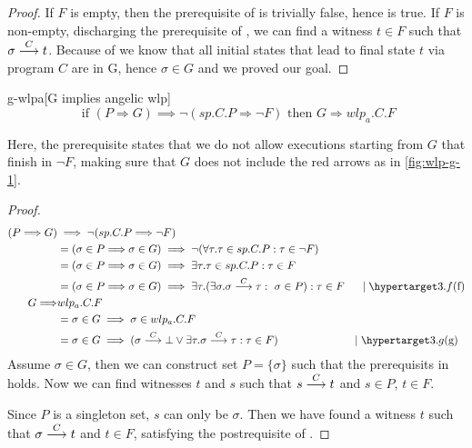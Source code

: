 \begin{proof}
If $F$ is empty, then the prerequisite of  is trivially false, hence  is true. 
If $F$ is non-empty, discharging the prerequisite of , we can find a witness $t\in F$ such that $\sigma\stackrel{C}{\longrightarrow}t$. 
Because of  we know that all initial states that lead to final state $t$ via program $C$ are in G, hence $\sigma\in G$ and we proved our goal. 
\end{proof}


\begin{lemma}{g-wlpa}[G implies angelic wlp]
\ \\ \vspace{-3mm}
	\[%
	\text{ if \ \ \ \ } 
	(P\Longrightarrow G) \implies \neg(sp.C.P \Longrightarrow \neg F)
	\text{\ \ \ \  then\ \ \ \  } 
	G \Longrightarrow wlp_a.C.F
	\] 
\end{lemma}
Here, the prerequisite states that we do not allow executions starting from $G$ that  finish in $\neg F$, making sure that $G$ does not include the red arrows as in \autoref{fig:wlp-g-1}.  

\begin{proof}
\begin{align*} 
	(P\Longrightarrow G) & \implies \neg(sp.C.P \Longrightarrow \neg F) \\ 
	&= (\sigma\in P \Longrightarrow \sigma\in G) \implies \neg(\forall\tau.\tau\in sp.C.P:\tau\in\neg F) \\ 
	&= (\sigma\in P \Longrightarrow \sigma\in G) \implies \exists\tau.\tau\in sp.C.P:\tau\in F \\ 
	&= (\sigma\in P \Longrightarrow \sigma\in G) \implies \exists\tau.(\exists \sigma. \sigma\goto{C}\tau: \  \sigma\in P):\tau\in F 
		\hspace{0.04\textwidth}\mid\lblth{f}\\ 
	G\Longrightarrow & wlp_a.C.F \\ 
	&= \sigma\in G\implies\sigma\in wlp_a.C.F\\
	&=\sigma\in G\implies (\sigma\goto{C}\bot\vee \exists \tau.\sigma\goto{C}\tau:\tau\in F) 
		\hspace{0.195\textwidth}\mid\lblth{g}\\
\end{align*}
Assume $\sigma\in G$, then we can construct set $P=\{\sigma\}$ such that the prerequisits in  holds. 
Now we can find witnesses $t$ and $s$ such that $s\stackrel{C}{\longrightarrow}t$ and $s\in P$, $t\in F$. 

Since $P$ is a singleton set, $s$ can only be $\sigma$. 
Then we have found a witness $t$ such that $\sigma\stackrel{C}{\longrightarrow}t$ and $t\in F$, satisfying the postrequisite of . 
\end{proof}

